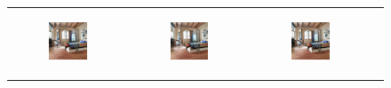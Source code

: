 \documentclass{article}
\begin{document}
\begin{figure}[H]
    \caption{The top row shows slight variations with no intervention due to noise injection, the bottom row shows the increased sensitivity to noisy variation with a significant number of units on layer 6 shut off (its perhaps more obvious in GIF format)}
\hspace{-2.5em}\begin{tabular}{c c c c}
    \begin{subfigure}[h!]{0.25\textwidth}
        \includegraphics[scale=0.35]{images/n1.png}
    \end{subfigure} & 
     \begin{subfigure}[h!]{0.25\textwidth}
        \includegraphics[scale=0.35]{images/n2.png}
    \end{subfigure} &
     \begin{subfigure}[h!]{0.25\textwidth}
        \includegraphics[scale=0.35]{images/n3.png}

\end{subfigure}
\end{tabular}
\end{figure}
\end{document}
